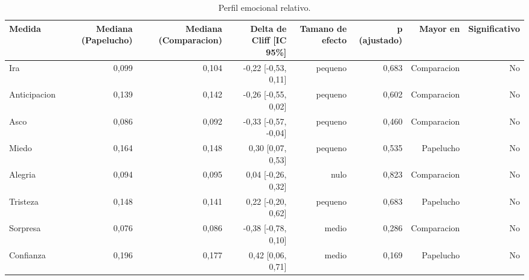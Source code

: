 \begin{table}[htbp]
\centering
\small
\caption{Perfil emocional relativo.}
\label{tab:emotions-relative-es}
\begin{tabular}{lrrrrrrr}
\toprule
\textbf{Medida} & \textbf{Mediana (Papelucho)} & \textbf{Mediana (Comparacion)} & \textbf{Delta de Cliff [IC 95\%]} & \textbf{Tamano de efecto} & \textbf{p (ajustado)} & \textbf{Mayor en} & \textbf{Significativo} \\
\midrule
Ira & 0,099 & 0,104 & -0,22 [-0,53, 0,11] & pequeno & 0,683 & Comparacion & No \\
Anticipacion & 0,139 & 0,142 & -0,26 [-0,55, 0,02] & pequeno & 0,602 & Comparacion & No \\
Asco & 0,086 & 0,092 & -0,33 [-0,57, -0,04] & pequeno & 0,460 & Comparacion & No \\
Miedo & 0,164 & 0,148 & 0,30 [0,07, 0,53] & pequeno & 0,535 & Papelucho & No \\
Alegria & 0,094 & 0,095 & 0,04 [-0,26, 0,32] & nulo & 0,823 & Comparacion & No \\
Tristeza & 0,148 & 0,141 & 0,22 [-0,20, 0,62] & pequeno & 0,683 & Papelucho & No \\
Sorpresa & 0,076 & 0,086 & -0,38 [-0,78, 0,10] & medio & 0,286 & Comparacion & No \\
Confianza & 0,196 & 0,177 & 0,42 [0,06, 0,71] & medio & 0,169 & Papelucho & No \\
\bottomrule
\end{tabular}
\end{table}

